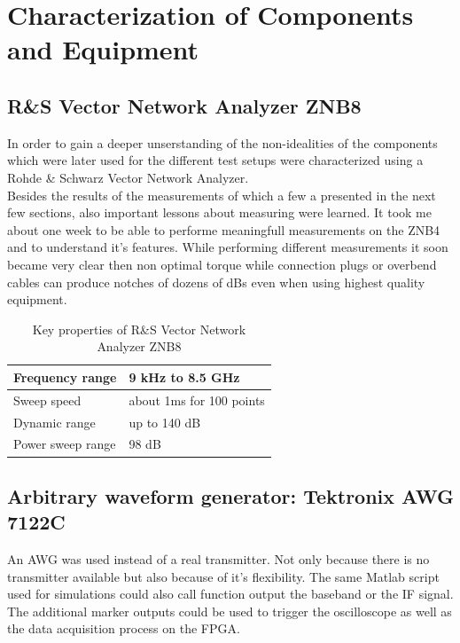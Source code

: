 \chapter{Characterization of Components and Equipment}

\section{R\&S Vector Network Analyzer ZNB8}
In order to gain a deeper unserstanding of the non-idealities of the
components which were later used for the different test setups
were characterized using a Rohde \& Schwarz Vector Network Analyzer. \\

Besides the results of the measurements of which a few a presented
in the next few sections, also important lessons about measuring were
learned. It took me about one week to be able to performe meaningfull
measurements on the ZNB4 and to understand it's features.
While performing different measurements it soon became very clear then
non optimal torque while connection plugs or overbend cables
can produce notches of dozens of dBs even when using highest quality
equipment. \\

\begin{table}[h]
  \centering
  \begin{tabular}{|l|l|}
    \hline
    Frequency range & 9 kHz to 8.5 GHz \\ \hline
    Sweep speed & about 1ms for 100 points \\ \hline
    Dynamic range & up to 140 dB \\ \hline
    Power sweep range & 98 dB \\ \hline
  \end{tabular}
  \caption{Key properties of R\&S Vector Network Analyzer ZNB8}
  \label{tab:awg}
\end{table}

\section{Arbitrary waveform generator: Tektronix AWG 7122C}
\label{osec:comp_awg}

An \acrfull{AWG} was used instead of a real transmitter.
Not only because there is no transmitter available but also because of
it's flexibility. The same Matlab script used for simulations could
also call function output the baseband or the \gls{IF} signal.
The additional marker outputs could be used to trigger the oscilloscope
as well as the data acquisition process on the \gls{FPGA}.

